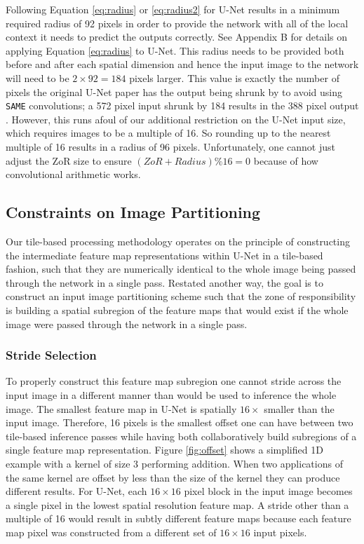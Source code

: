 \documentclass[letterpaper]{article} %
\begin{document}
Following Equation \ref{eq:radius} or \ref{eq:radius2} for U-Net results in a minimum required radius of 92 pixels in order to provide the network with all of the local context it needs to predict the outputs correctly. See Appendix B for details on applying Equation \ref{eq:radius} to U-Net. This radius needs to be provided both before and after each spatial dimension and hence the input image to the network will need to be $2 \times 92 = 184$ pixels larger. This value is exactly the number of pixels the original U-Net paper has the output being shrunk by to avoid using \texttt{SAME} convolutions; a 572 pixel input shrunk by 184 results in the 388 pixel output \cite{Ronneberger2015a}. 
However, this runs afoul of our additional restriction on the U-Net input size, which requires images to be a multiple of 16. So rounding up to the nearest multiple of 16 results in a radius of 96 pixels. Unfortunately, one cannot just adjust the ZoR size to ensure $(ZoR + Radius) \% 16 = 0$ because of how convolutional arithmetic works. 

\subsection{Constraints on Image Partitioning}

Our tile-based processing methodology operates on the principle of constructing the intermediate feature map representations within U-Net in a tile-based fashion, such that they are numerically identical to the whole image being passed through the network in a single pass. Restated another way, the goal is to construct an input image partitioning scheme such that the zone of responsibility is building a spatial subregion of the feature maps that would exist if the whole image were passed through the network in a single pass. 

\subsubsection{Stride Selection}
To properly construct this feature map subregion one cannot stride across the input image in a different manner than would be used to inference the whole image. The smallest feature map in U-Net is spatially $16 \times$ smaller than the input image. Therefore, 16 pixels is the smallest offset one can have between two tile-based inference passes while having both collaboratively build subregions of a single feature map representation. Figure \ref{fig:offset} shows a simplified 1D example with a kernel of size 3 performing addition. When two applications of the same kernel are offset by less than the size of the kernel they can produce different results. 
For U-Net, each $16 \times 16$ pixel block in the input image becomes a single pixel in the lowest spatial resolution feature map. A stride other than a multiple of 16 would result in subtly different feature maps because each feature map pixel was constructed from a different set of $16 \times 16$ input pixels. 
\end{document}
